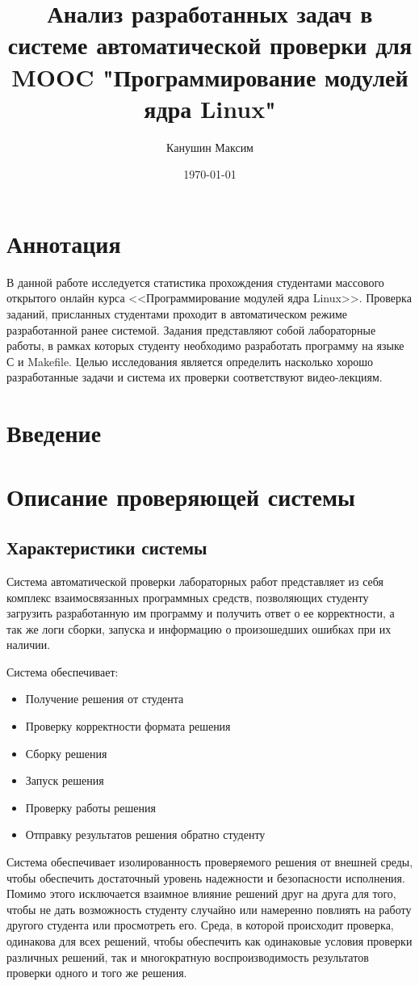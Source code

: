 \documentclass[a4paper,12pt]{article}
\author{Канушин Максим}
\title{Анализ разработанных задач в системе автоматической проверки для MOOC "Программирование модулей ядра Linux"}
\date{\today}
\begin{document}

\maketitle
\section{Аннотация}
В данной работе исследуется статистика прохождения студентами массового открытого онлайн курса <<Программирование модулей ядра Linux>>. Проверка заданий, присланных студентами проходит в автоматическом режиме разработанной ранее системой. Задания представляют собой лабораторные работы, в рамках которых студенту необходимо разработать программу на языке С и Makefile. Целью исследования является определить насколько хорошо разработанные задачи и система их проверки соответствуют видео-лекциям.

\section{Введение}

\section{Описание проверяющей системы}
\subsection{Характеристики системы}
Система автоматической проверки лабораторных работ представляет из себя комплекс взаимосвязанных программных средств, позволяющих студенту загрузить разработанную им программу и получить ответ о ее корректности, а так же логи сборки, запуска и информацию о произошедших ошибках при их наличии.

Система обеспечивает:
\begin{itemize}
	\item Получение решения от студента
	\item Проверку корректности формата решения
	\item Сборку решения
	\item Запуск решения
	\item Проверку работы решения
	\item Отправку результатов решения обратно студенту
\end{itemize}

Система обеспечивает изолированность проверяемого решения от внешней среды, чтобы обеспечить достаточный уровень надежности и безопасности исполнения. Помимо этого исключается взаимное влияние решений друг на друга для того, чтобы не дать возможность студенту случайно или намеренно повлиять на работу другого студента или просмотреть его. Среда, в которой происходит проверка, одинакова для всех решений, чтобы обеспечить как одинаковые условия проверки различных решений, так и многократную воспроизводимость результатов проверки одного и того же решения.
\end{document}
